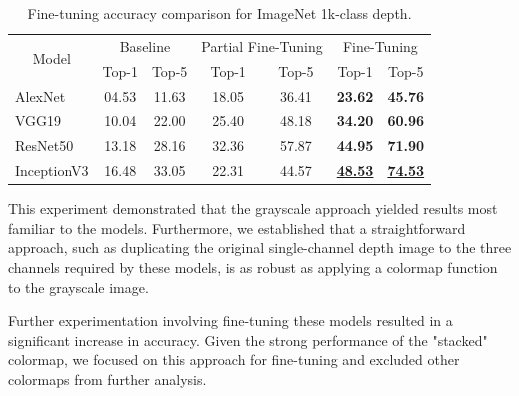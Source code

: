 \begin{table}[htbp]
    \centering
    \begin{tabular}{|l|cc|cc|cc|}
        \hline
        \multicolumn{1}{|c|}{\multirow{2}{*}{Model}} & \multicolumn{2}{c|}{Baseline} & \multicolumn{2}{c|}{Partial Fine-Tuning} & \multicolumn{2}{c|}{Fine-Tuning}                                 \\ \cline{2-7} 
        \multicolumn{1}{|c|}{}                       & \multicolumn{1}{c|}{Top-1}  & Top-5 & \multicolumn{1}{c|}{Top-1}    & Top-5    & \multicolumn{1}{c|}{Top-1}                & Top-5                \\ \hline
        AlexNet                                      & \multicolumn{1}{c|}{04.53}  & 11.63 & \multicolumn{1}{c|}{18.05}    & 36.41    & \multicolumn{1}{c|}{\textbf{23.62}}       & \textbf{45.76}       \\ \hline
        VGG19                                        & \multicolumn{1}{c|}{10.04}  & 22.00 & \multicolumn{1}{c|}{25.40}    & 48.18    & \multicolumn{1}{c|}{\textbf{34.20}}       & \textbf{60.96}       \\ \hline
        ResNet50                                     & \multicolumn{1}{c|}{13.18}  & 28.16 & \multicolumn{1}{c|}{32.36}    & 57.87    & \multicolumn{1}{c|}{\textbf{44.95}}       & \textbf{71.90}       \\ \hline
        InceptionV3                                  & \multicolumn{1}{c|}{16.48}  & 33.05 & \multicolumn{1}{c|}{22.31}    & 44.57    & \multicolumn{1}{c|}{\underline{\textbf{48.53}}} & \underline{\textbf{74.53}} \\ \hline
    \end{tabular}
    \caption{Fine-tuning accuracy comparison for ImageNet 1k-class depth.}
    \label{tab:finetuning_accuracy}
\end{table}

This experiment demonstrated that the grayscale approach yielded results most familiar to the models. Furthermore, we established that a straightforward approach, such as duplicating the original single-channel depth image to the three channels required by these models, is as robust as applying a colormap function to the grayscale image.

Further experimentation involving fine-tuning these models resulted in a significant increase in accuracy. Given the strong performance of the "stacked" colormap, we focused on this approach for fine-tuning and excluded other colormaps from further analysis.

